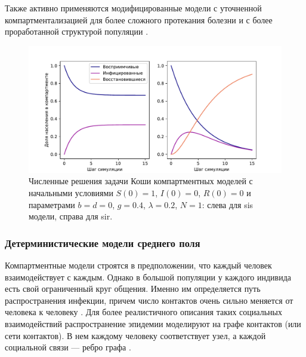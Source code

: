 \documentclass[a4paper,12pt]{article} %
\begin{document}
Также активно применяются модифицированные модели с уточненной компартментализацией для более сложного протекания болезни \cite{keeling2005networks, anderson1988epidemiology, grenfell2001travelling} и с более проработанной структурой популяции \cite{hethcote1984springer, ghani1997role, keeling1997modelling}.



\begin{figure}[]
    \centering
    \includegraphics[width=\linewidth]{images/compartment.pdf}
    \caption{Численные решения задачи Коши компартментных моделей с начальными условиями $S(0)=1$, $I(0)=0$, $R(0)=0$ и параметрами $b=d=0$, $g=0.4$, $\lambda=0.2$, $N=1$: слева для \gls{sis} модели, справа для \gls{sir}.}
\end{figure}


\subsubsection{Детерминистические модели среднего поля}
Компартментные модели строятся в предположении, что каждый человек взаимодействует с каждым. Однако в большой популяции у каждого индивида есть свой ограниченный круг общения. Именно им определяется путь распространения инфекции, причем число контактов очень сильно меняется от человека к человеку \cite{pastor2001epidemic}. Для более реалистичного описания таких социальных взаимодействий распространение эпидемии моделируют на графе контактов (или сети контактов). В нем каждому человеку соответствует узел, а каждой социальной связи --- ребро графа \cite{sherborne2018mean}.
\end{document}
